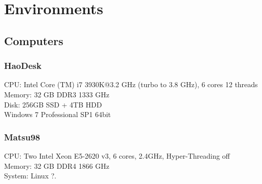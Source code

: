 \section{Environments}

\subsection{Computers}
\subsubsection{HaoDesk}
\label{HaoDesk}

CPU: Intel Core (TM) i7 3930K@3.2 GHz (turbo to 3.8 GHz), 6 cores 12 threads\\
Memory: 32 GB DDR3 1333 GHz\\
Disk: 256GB SSD + 4TB HDD\\ 
Windows 7 Professional SP1 64bit

\subsubsection{Matsu98}
\label{Matsu98}
CPU: Two Intel Xeon E5-2620 v3, 6 cores, 2.4GHz, Hyper-Threading off\\
Memory: 32 GB DDR4 1866 GHz\\
System: Linux ?. 
 

